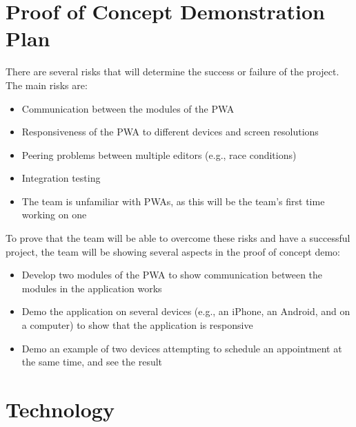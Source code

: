 \documentclass{article}
\begin{document}
\section{Proof of Concept Demonstration Plan}

There are several risks that will determine the success or failure of the project. The main risks
are:

\begin{itemize}
	\item Communication between the modules of the PWA
	\item Responsiveness of the PWA to different devices and screen resolutions
	\item Peering problems between multiple editors (e.g., race conditions)
	\item Integration testing
	\item The team is unfamiliar with PWAs, as this will be the team's first time working on one
\end{itemize}

To prove that the team will be able to overcome these risks and have a successful project, the team
will be showing several aspects in the proof of concept demo:

\begin{itemize}
	\item Develop two modules of the PWA to show communication between the modules in the application works
	\item Demo the application on several devices (e.g., an iPhone, an Android, and on a computer) to show
	      that the application is responsive
	\item Demo an example of two devices attempting to schedule an appointment at the same time, and see the
	      result
\end{itemize}

\section{Technology}

\end{document}
